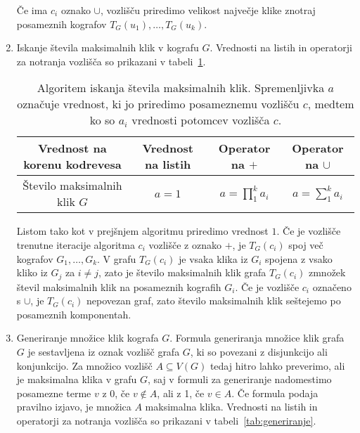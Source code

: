 \documentclass[12pt,a4paper,twoside]{article}
\theoremstyle{definition} %
\theoremstyle{plain} %
\numberwithin{equation}{section}  %
\begin{document}
\begin{enumerate}[label=($\roman*$)]
Če ima $c_i$ oznako $\cup$, vozlišču priredimo velikost največje klike znotraj posameznih kografov $T_G(u_1), \dots, T_G(u_k)$.



\item Iskanje števila maksimalnih klik v kografu $G$. Vrednosti na listih in operatorji za notranja vozlišča so prikazani v tabeli~\ref{tab:iskanjeStevilaMaxKlik}.

\begin{table}[h!]
\begin{adjustbox}{width=\columnwidth,center}
\begin{tabular}{c|ccc}
Vrednost na korenu kodrevesa & Vrednost na listih   & Operator na $+$   &  Operator na $\cup$  \\ \hline
Število maksimalnih klik $G$ & $a=1$    &   $a=\prod_1^k a_i$   &     $a=\sum_1^k a_i$   
\end{tabular}
\end{adjustbox}
\caption{Algoritem iskanja števila maksimalnih klik. Spremenljivka $a$ označuje vrednost, ki jo priredimo posameznemu vozlišču $c$, medtem ko so $a_i$ vrednosti potomcev vozlišča $c$.}
\label{tab:iskanjeStevilaMaxKlik}
\end{table}

Listom tako kot v prejšnjem algoritmu priredimo vrednost $1$. Če je vozlišče trenutne iteracije algoritma $c_i$ vozlišče z oznako $+$, je $T_G(c_i)$ spoj več kografov $G_1, \dots, G_k$. V grafu $T_G(c_i)$ je vsaka klika iz $G_i$ spojena z vsako kliko iz $G_j$ za $i \neq j$, zato je število maksimalnih klik grafa $T_G(c_i)$ zmnožek števil maksimalnih klik na posameznih kografih $G_i$. Če je vozlišče $c_i$ označeno s $\cup$, je $T_G(c_i)$ nepovezan graf, zato število maksimalnih klik seštejemo po posameznih komponentah.

\item Generiranje množice klik kografa $G$.
Formula generiranja množice klik grafa $G$ je sestavljena iz oznak vozlišč grafa $G$, ki so povezani z disjunkcijo ali konjunkcijo. Za množico vozlišč $A \subseteq V(G)$ tedaj hitro lahko preverimo, ali je maksimalna klika v grafu $G$, saj v formuli za generiranje nadomestimo posamezne terme $v$ z 0, če $v \notin A$, ali z 1, če $v \in A$. Če formula podaja pravilno izjavo, je množica $A$ maksimalna klika. Vrednosti na listih in operatorji za notranja vozlišča so prikazani v tabeli~\ref{tab:generiranje}.


\end{enumerate}
\end{document}
